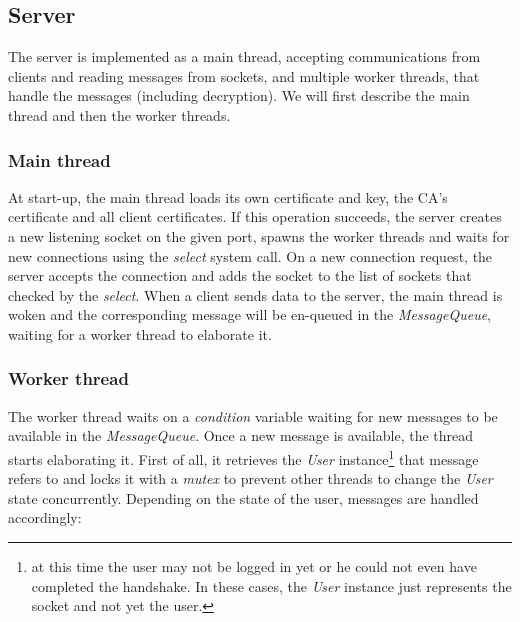 \subsection{Server}
The server is implemented as a main thread, accepting communications from 
clients and reading messages from sockets, and multiple worker threads, that 
handle the messages (including decryption). We will first describe the main 
thread and then the worker threads.

\subsubsection{Main thread}
At start-up, the main thread loads its own certificate and key, the CA's 
certificate and all client certificates. If this operation succeeds, the 
server creates a new listening socket on the given port, spawns the worker 
threads and waits for new connections using the \emph{select} system call.
On a new connection request, the server accepts the connection and adds the 
socket to the list of sockets that checked by the \emph{select}. When a client
sends data to the server, the main thread is woken and the corresponding 
message will be en-queued in the \emph{MessageQueue}, waiting for a worker
thread to elaborate it.

\subsubsection{Worker thread}
The worker thread waits on a \emph{condition} variable waiting for new messages
to be available in the \emph{MessageQueue}. Once a new message is available,
the thread starts elaborating it. First of all, it retrieves the \emph{User}
instance\footnote{at this time the user may not be logged in yet or he could 
not even have completed the handshake. In these cases, the \emph{User} instance
just represents the socket and not yet the user.} that message refers to and 
locks it with a \emph{mutex} to prevent other threads to change the \emph{User} 
state concurrently. Depending on the state of the user, messages are handled
accordingly:


